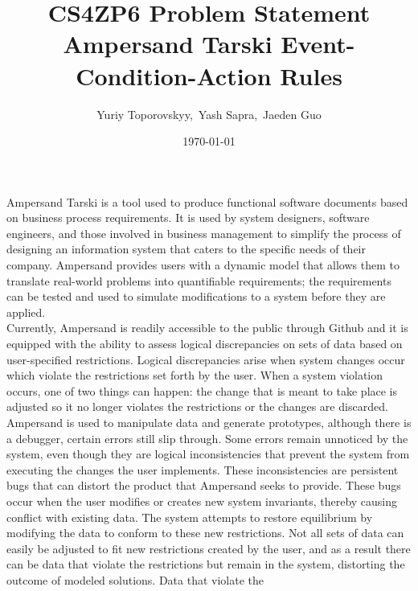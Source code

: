 \documentclass[12pt]{article}
\begin{document}
\title{CS4ZP6 Problem Statement \\ Ampersand Tarski Event-Condition-Action 
Rules \\ \vspace{-2ex}} 
\author{\normalsize{Yuriy Toporovskyy,\ Yash Sapra,\ Jaeden Guo}}
\date{\vspace{-1.5em}\normalsize\today}

\thispagestyle{empty}
\maketitle\vspace{-1.5em}

Ampersand Tarski is a tool used to produce functional software documents based 
on business process requirements. It is used by system 
designers, software engineers, and those involved in business management to 
simplify the process of designing an information system that caters to the 
specific needs of their company. 
Ampersand provides users with a dynamic model that allows them to translate 
real-world problems into quantifiable requirements; the requirements can be 
tested and used to simulate modifications to a system before they are 
applied.\\ \indent
Currently, Ampersand is readily accessible to the public through Github and it 
is equipped with the ability to assess logical 
discrepancies on sets of data based on user-specified restrictions. Logical 
discrepancies arise when system changes occur which violate the 
restrictions set forth by the user. When a system violation occurs, one of two 
things can happen: the change that is meant to take place is adjusted so it no 
longer violates the restrictions or the changes are discarded. Ampersand is 
used to manipulate data and generate prototypes, although there is a debugger, 
certain errors still slip through. Some errors remain unnoticed by the system, 
even though they are logical inconsistencies that prevent the system from 
executing the changes the user implements. These inconsistencies are persistent 
bugs that can distort the product that Ampersand seeks to provide. These bugs 
occur when the user modifies or creates new system invariants, thereby causing 
conflict with existing data. The system attempts to restore equilibrium by 
modifying the data to conform to these new restrictions. Not all sets of data 
can easily be adjusted to fit new restrictions created by the user, and as a 
result there can be data that violate the restrictions but remain in the 
system, distorting the outcome of modeled solutions. Data that violate the 
\end{document}
